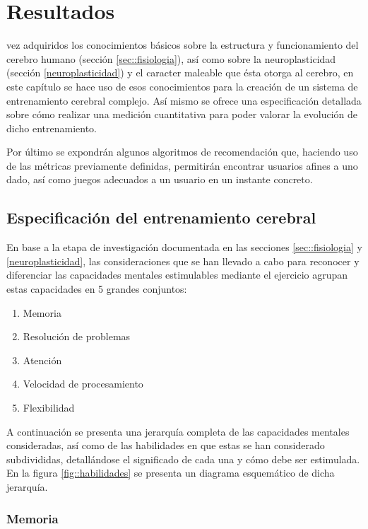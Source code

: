 \chapter{Resultados}
\label{chap:resultados}

 vez adquiridos los conocimientos básicos sobre la estructura y funcionamiento del cerebro humano (sección \ref{sec::fisiologia}), así como sobre la neuroplasticidad (sección \ref{neuroplasticidad}) y el caracter maleable que ésta otorga al cerebro, en este capítulo se hace uso de esos conocimientos para la creación de un sistema de entrenamiento cerebral complejo. Así mismo se ofrece una especificación detallada sobre cómo realizar una medición cuantitativa para poder valorar la evolución de dicho entrenamiento.

Por último se expondrán algunos algoritmos de recomendación que, haciendo uso de las métricas previamente definidas, permitirán encontrar usuarios afines a uno dado, así como juegos adecuados a un usuario en un instante concreto.

\section{Especificación del entrenamiento cerebral}
\label{sec:entrenamiento}
En base a la etapa de investigación documentada en las secciones \ref{sec::fisiologia} y \ref{neuroplasticidad}, las consideraciones que se han llevado a cabo para reconocer y diferenciar las capacidades mentales estimulables mediante el ejercicio agrupan estas capacidades en 5 grandes conjuntos:

\renewcommand{\labelenumi}{\bf\arabic{enumi}. }
\begin{enumerate}
\item Memoria
\item Resolución de problemas
\item Atención
\item Velocidad de procesamiento
\item Flexibilidad
\end{enumerate}

A continuación se presenta una jerarquía completa de las capacidades mentales consideradas, así como de las habilidades en que estas se han considerado subdivididas, detallándose el significado de cada una y cómo debe ser estimulada. En la figura \ref{fig::habilidades} se presenta un diagrama esquemático de dicha jerarquía.

\subsection*{Memoria}

